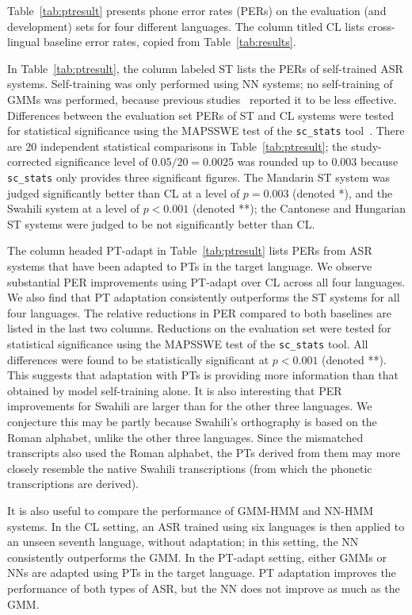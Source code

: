 Table~\ref{tab:ptresult} presents phone error rates (PERs) on the
evaluation (and development) sets for four different languages. The
column titled {\sc CL} lists cross-lingual baseline error rates,
copied from Table~\ref{tab:results}.

In Table~\ref{tab:ptresult}, the column labeled {\sc ST} lists the
PERs of self-trained ASR systems. Self-training was only performed
using NN systems; no self-training of GMMs was performed, because
previous studies~\cite{Huang2013} reported it to be less effective.
Differences between the evaluation set PERs of {\sc ST} and {\sc CL}
systems were tested for statistical significance using the MAPSSWE
test of the {\tt sc\_stats} tool~\cite{Pallet90}.  There are 20
independent statistical comparisons in Table~\ref{tab:ptresult}; the
study-corrected significance level of $0.05/20=0.0025$ was rounded up
to $0.003$ because {\tt sc\_stats} only provides three significant
figures.  The Mandarin {\sc ST} system was judged significantly better
than {\sc CL} at a level of $p=0.003$ (denoted *), and the Swahili
system at a level of $p<0.001$ (denoted **); the Cantonese and
Hungarian {\sc ST} systems were judged to be not significantly better
than {\sc CL}.

The column headed {\sc PT-adapt} in Table~\ref{tab:ptresult} lists
PERs from ASR systems that have been adapted to PTs in the target
language. We observe substantial PER improvements using {\sc PT-adapt}
over {\sc CL} across all four languages. We also find that PT
adaptation consistently outperforms the {\sc ST} systems for all four
languages. The relative reductions in PER compared to both baselines
are listed in the last two columns.  Reductions on the evaluation set
were tested for statistical significance using the MAPSSWE test of the
{\tt sc\_stats} tool.  All differences were found to be statistically
significant at $p<0.001$ (denoted **).  This suggests that adaptation
with PTs is providing more information than that obtained by model
self-training alone. It is also interesting that PER
improvements for Swahili are larger than for the other three
languages. We conjecture this may be partly because Swahili's
orthography is based on the Roman alphabet, unlike the other three
languages. Since the mismatched transcripts also used the Roman
alphabet, the PTs derived from them may more closely resemble the
native Swahili transcriptions (from which the phonetic transcriptions
are derived).

It is also useful to compare the performance of GMM-HMM and NN-HMM
systems.  In the {\sc CL} setting, an ASR trained
using six languages is then applied to an unseen seventh language,
without adaptation; in this setting, the NN consistently outperforms
the GMM.  In the {\sc PT-adapt} setting, either GMMs or NNs are
adapted using PTs in the target language.  PT adaptation improves the
performance of both types of ASR, but the NN does not improve as much
as the GMM.

